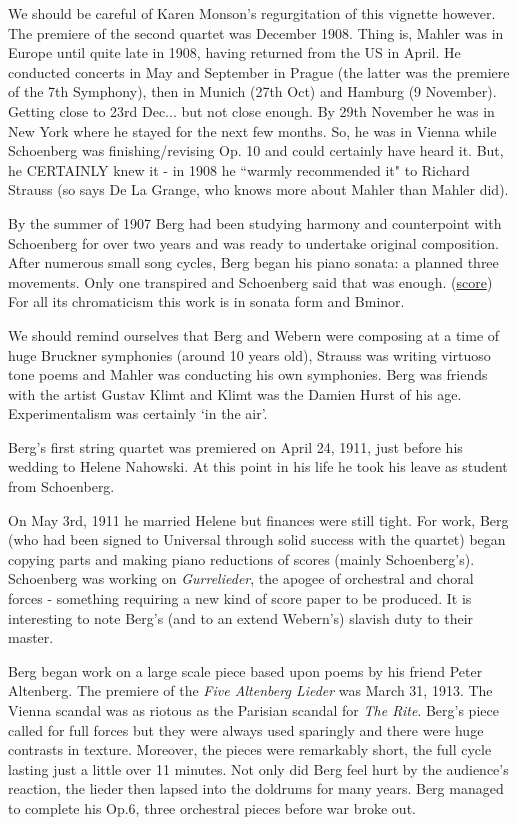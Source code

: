 We should be careful of Karen Monson's regurgitation of this vignette however. The premiere of the second 
quartet was December 1908. Thing is, Mahler was in Europe until quite late in 1908, having returned from the 
US in April. He conducted concerts in May and September in Prague (the latter was the premiere of the 7th 
Symphony), then in Munich (27th Oct) and Hamburg (9 November). Getting close to 23rd Dec... but not close 
enough. By 29th November he was in New York where he stayed for the next few months. So, he was in Vienna 
while Schoenberg was finishing/revising Op. 10 and could certainly have heard it. But, he CERTAINLY knew it - 
in 1908 he ``warmly recommended it" to Richard Strauss (so says De La Grange, who knows more about Mahler 
than Mahler did). 

By the summer of 1907 Berg had been studying harmony and counterpoint with Schoenberg for over two years and was ready to undertake original composition. After numerous small song cycles, Berg began his piano sonata: a planned three movements. Only one transpired and Schoenberg said that was enough. (\href{http://petrucci.mus.auth.gr/imglnks/usimg/7/75/IMSLP234327-SIBLEY1802.21900.4ff7-39087012041663score.pdf}{score})
For all its chromaticism this work is in sonata form and Bminor. 

We should remind ourselves that Berg and Webern were composing at a time of huge Bruckner symphonies (around 10 years old), Strauss was writing virtuoso tone poems and Mahler was conducting his own symphonies. 
Berg was friends with the artist Gustav Klimt and Klimt was the Damien Hurst of his age. Experimentalism was certainly `in the air'.

Berg's first string quartet was premiered on April 24, 1911, just before his wedding to Helene Nahowski. At this point in his life he took his leave as student from Schoenberg. 

On May 3rd, 1911 he married Helene but finances were still tight. For work, Berg (who had been signed to Universal through solid success with the quartet) began copying parts and making piano reductions of scores (mainly Schoenberg's). Schoenberg was working on \textit{Gurrelieder}, the apogee of orchestral and choral forces - something requiring a new kind of score paper to be produced. It is interesting to note Berg's (and to an extend Webern's) slavish duty to their master.  

Berg began work on a large scale piece based upon poems by his friend Peter Altenberg. The premiere of the \textit{Five Altenberg Lieder} was March 31, 1913. The Vienna scandal was as riotous as the Parisian scandal for \textit{The Rite}. Berg's piece called for full forces but they were always used sparingly and there were huge contrasts in texture. Moreover, the pieces were remarkably short, the full cycle lasting just a little over 11 minutes. Not only did Berg feel hurt by the audience's reaction, the lieder then lapsed into the doldrums for many years. Berg managed to complete his Op.6, three orchestral pieces before war broke out. 

